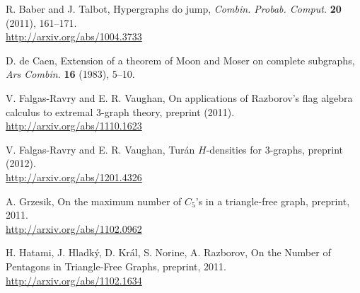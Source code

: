 \documentclass{article}
\begin{document}
\newpage

\begin{thebibliography}{10}

 R. Baber and J. Talbot, Hypergraphs do jump, \emph{Combin. Probab. Comput.} \textbf{20} (2011), 161--171. \\ %
\url{http://arxiv.org/abs/1004.3733}

 D. de Caen, Extension of a theorem of Moon and Moser on complete subgraphs, \emph{Ars Combin.} \textbf{16} (1983), 5--10.


 V. Falgas-Ravry and E. R. Vaughan, On applications of Razborov's flag algebra calculus to extremal 3-graph theory, preprint (2011). \\
\url{http://arxiv.org/abs/1110.1623}

 V. Falgas-Ravry and E. R. Vaughan, Turán $H$-densities for 3-graphs, preprint (2012). \\
\url{http://arxiv.org/abs/1201.4326}



 A. Grzesik, On the maximum number of $C_5$'s in a triangle-free graph, preprint, 2011. \\ \url{http://arxiv.org/abs/1102.0962}

 H. Hatami, J. Hladký, D. Král, S. Norine, A. Razborov, On the Number of Pentagons in Triangle-Free Graphs, preprint, 2011. \\
\url{http://arxiv.org/abs/1102.1634}


\end{thebibliography}
\end{document}
